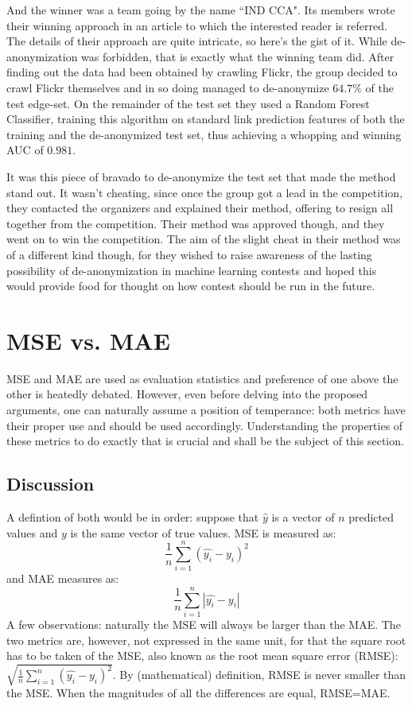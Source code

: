 \documentclass[english, a4paper]{article}
\begin{document}
And the winner was a team going by the name ``IND CCA". Its members wrote their winning approach in an article \cite{6033446} to which the interested reader is referred. The details of their approach are quite intricate, so here's the gist of it. While de-anonymization was forbidden, that is exactly what the winning team did. After finding out the data had been obtained by crawling Flickr, the group decided to crawl Flickr themselves and in so doing managed to de-anonymize $64.7 \%$ of the test edge-set. On the remainder of the test set they used a Random Forest Classifier, training this algorithm on standard link prediction features of both the training and the de-anonymized test set, thus achieving a whopping and winning AUC of $0.981$.

It was this piece of bravado to de-anonymize the test set that made the method stand out. It wasn't cheating, since once the group got a lead in the competition, they contacted the organizers and explained their method, offering to resign all together from the competition. Their method was approved though, and they went on to win the competition. The aim of the slight cheat in their method was of a different kind though, for they wished to raise awareness of the lasting possibility of de-anonymization in machine learning contests and hoped this would provide food for thought on how contest should be run in the future.

\section{MSE vs. MAE}
MSE and MAE are used as evaluation statistics and preference of one above the other is heatedly debated. However, even before delving into the proposed arguments, one can naturally assume a position of temperance: both metrics have their proper use and should be used accordingly. Understanding the properties of these metrics to do exactly that is crucial and shall be the subject of this section.

\subsection{Discussion}
A defintion of both would be in order: suppose that $\hat{y}$ is a vector of $n$ predicted values and $y$ is the same vector of true values. MSE is measured as:
$$
\frac{1}{n}\sum_{i=1}^{n}(\hat{y_{i}} - y_{i})^{2}
$$  
and MAE measures as:
$$
\frac{1}{n}\sum_{i=1}^{n}|\hat{y_{i}}-y_{i}|
$$
A few observations: naturally the MSE will always be larger than the MAE. The two metrics are, however, not expressed in the same unit, for that the square root has to be taken of the MSE, also known as the root mean square error (RMSE): $ \sqrt{\frac{1}{n}\sum_{i=1}^{n}(\hat{y_{i}} - y_{i})^{2}}$. By (mathematical) definition, RMSE is never smaller than the MSE. When the magnitudes of all the differences are equal, RMSE=MAE. 
\end{document}
